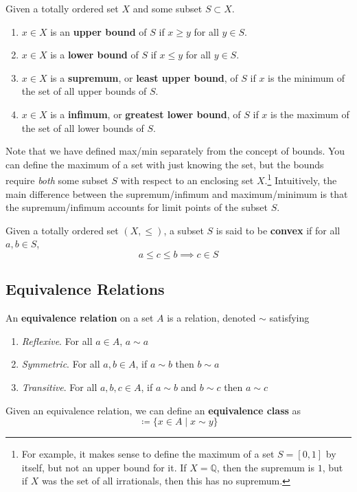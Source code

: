   \begin{definition}[Bounds]
    Given a totally ordered set $X$ and some subset $S \subset X$. 
    \begin{enumerate}
      \item $x \in X$ is an \textbf{upper bound} of $S$ if $x \geq y$ for all $y \in S$. 
      \item $x \in X$ is a \textbf{lower bound} of $S$ if $x \leq y$ for all $y \in S$. 
      \item $x \in X$ is a \textbf{supremum}, or \textbf{least upper bound}, of $S$ if $x$ is the minimum of the set of all upper bounds of $S$. 
      \item $x \in X$ is a \textbf{infimum}, or \textbf{greatest lower bound}, of $S$ if $x$ is the maximum of the set of all lower bounds of $S$. 
    \end{enumerate}
  \end{definition}

  Note that we have defined max/min separately from the concept of bounds. You can define the maximum of a set with just knowing the set, but the bounds require \textit{both} some subset $S$ with respect to an enclosing set $X$.\footnote{For example, it makes sense to define the maximum of a set $S = [0, 1]$ by itself, but not an upper bound for it. If $X = \mathbb{Q}$, then the supremum is $1$, but if $X$ was the set of all irrationals, then this has no supremum.} Intuitively, the main difference between the supremum/infimum and maximum/minimum is that the supremum/infimum accounts for limit points of the subset $S$. 

  \begin{definition}
    Given a totally ordered set $(X, \leq)$, a subset $S$ is said to be \textbf{convex} if for all $a, b \in S$, 
    \begin{equation}
      a \leq c \leq b \implies c \in S
    \end{equation}
  \end{definition}

\subsection{Equivalence Relations}

  \begin{definition}
    An \textbf{equivalence relation} on a set $A$ is a relation, denoted $\sim$ satisfying 
    \begin{enumerate}
      \item \textit{Reflexive}. For all $a \in A$, $a \sim a$
      \item \textit{Symmetric}. For all $a,b \in A$, if $a \sim b$ then $b \sim a$
      \item \textit{Transitive}. For all $a,b,c \in A$, if $a \sim b$ and $b \sim c$ then $a \sim c$
    \end{enumerate}
    Given an equivalence relation, we can define an \textbf{equivalence class} as 
    \begin{equation}
      [y] \coloneqq \{ x \in A \mid x \sim y \}
    \end{equation}
  \end{definition}

